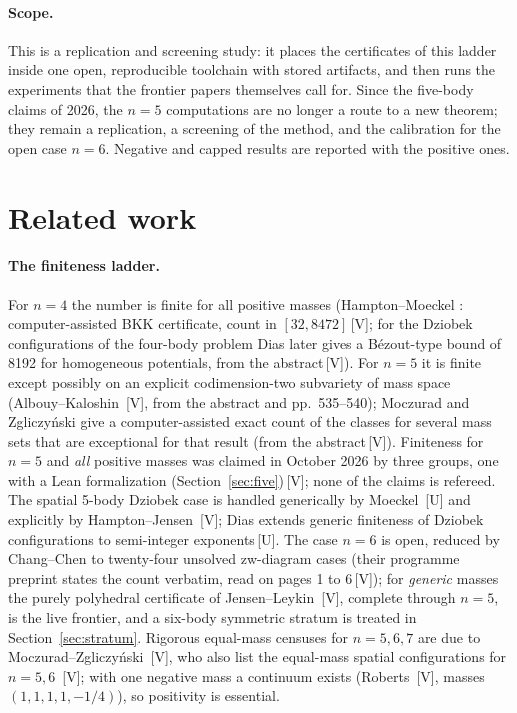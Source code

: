 \documentclass[11pt]{article}
\theoremstyle{definition}
\theoremstyle{remark}
\newcommand{\mk}[1]{\,{\scriptsize[#1]}}
\newcommand{\Vm}{\mk{V}}
\newcommand{\Um}{\mk{U}}
\begin{document}
\paragraph{Scope.}
This is a replication and screening study: it places the certificates of this ladder inside
one open, reproducible toolchain with stored artifacts, and then runs the experiments that
the frontier papers themselves call for. Since the five-body claims of 2026, the $n=5$
computations are no longer a route to a new theorem; they remain a replication, a screening of
the method, and the calibration for the open case $n=6$. Negative and capped results are
reported with the positive ones.

\section{Related work}\label{sec:related}

\paragraph{The finiteness ladder.}
For $n=4$ the number is finite for all positive masses (Hampton--Moeckel \cite{HM06}:
computer-assisted BKK certificate, count in $[32,8472]$\Vm; for the Dziobek configurations of the four-body problem
Dias \cite{Dias26} later gives a B\'ezout-type bound of 8192 for homogeneous potentials, from the abstract\Vm). For $n=5$ it
is finite except possibly on an explicit
codimension-two subvariety of mass space (Albouy--Kaloshin \cite{AK12}\Vm, from the abstract and
pp.~535--540); Moczurad and Zgliczy\'nski \cite{MZ26} give a computer-assisted exact count of the classes
for several mass sets that are exceptional for that result (from the abstract\Vm). Finiteness for $n=5$ and \emph{all} positive masses was claimed in October 2026
by three groups, one with a Lean formalization (Section~\ref{sec:five})\Vm; none of the claims
is refereed. The spatial 5-body Dziobek case is handled generically by Moeckel \cite{Moeckel01}\Um
and explicitly by Hampton--Jensen \cite{HJ11}\Vm; Dias \cite{Dias17} extends generic finiteness of Dziobek
configurations to semi-integer exponents\Um. The case $n=6$ is open, reduced by
Chang--Chen \cite{ChangChen23} to twenty-four unsolved zw-diagram cases (their programme
preprint states the count verbatim, read on pages 1 to 6\Vm); for \emph{generic} masses the
purely polyhedral certificate of Jensen--Leykin \cite{JL25}\Vm, complete through $n=5$, is the
live frontier, and a six-body symmetric stratum is treated in Section~\ref{sec:stratum}.
Rigorous equal-mass censuses for $n=5,6,7$ are due to Moczurad--Zgliczy\'nski \cite{MZ19}\Vm, who also list
the equal-mass spatial configurations for $n=5,6$ \cite{MZ20}\Vm;
with one negative mass a continuum exists (Roberts \cite{Roberts99}\Vm, masses
$(1,1,1,1,-1/4)$), so positivity is essential.
\end{document}
